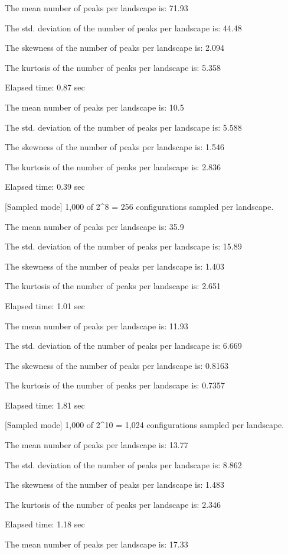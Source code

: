 \documentclass[
  article]{jss}
\begin{document}
\begin{CodeChunk}
\begin{CodeOutput}
The mean number of peaks per landscape is: 71.93 

The std. deviation of the number of peaks per landscape is: 44.48 

The skewness of the number of peaks per landscape is: 2.094 

The kurtosis of the number of peaks per landscape is: 5.358 

Elapsed time: 0.87 sec

The mean number of peaks per landscape is: 10.5 

The std. deviation of the number of peaks per landscape is: 5.588 

The skewness of the number of peaks per landscape is: 1.546 

The kurtosis of the number of peaks per landscape is: 2.836 

Elapsed time: 0.39 sec

[Sampled mode] 1,000 of 2^8 = 256 configurations sampled per landscape.

The mean number of peaks per landscape is: 35.9 

The std. deviation of the number of peaks per landscape is: 15.89 

The skewness of the number of peaks per landscape is: 1.403 

The kurtosis of the number of peaks per landscape is: 2.651 

Elapsed time: 1.01 sec

The mean number of peaks per landscape is: 11.93 

The std. deviation of the number of peaks per landscape is: 6.669 

The skewness of the number of peaks per landscape is: 0.8163 

The kurtosis of the number of peaks per landscape is: 0.7357 

Elapsed time: 1.81 sec

[Sampled mode] 1,000 of 2^10 = 1,024 configurations sampled per landscape.

The mean number of peaks per landscape is: 13.77 

The std. deviation of the number of peaks per landscape is: 8.862 

The skewness of the number of peaks per landscape is: 1.483 

The kurtosis of the number of peaks per landscape is: 2.346 

Elapsed time: 1.18 sec

The mean number of peaks per landscape is: 17.33 


\end{CodeOutput}
\end{CodeChunk}
\end{document}
